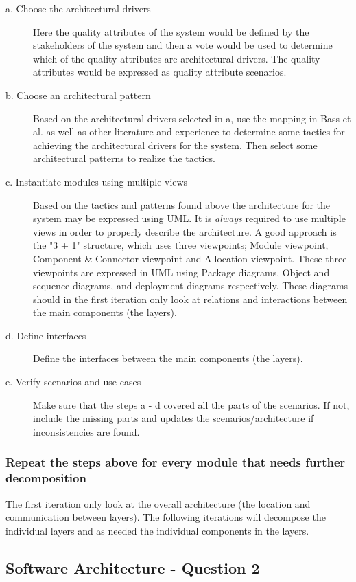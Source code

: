 \begin{description}
    \item[a. Choose the architectural drivers]
  Here the quality attributes of the system would be defined by the stakeholders of the system and then a vote would be used to determine which of the quality attributes are architectural drivers. The quality attributes would be expressed as quality attribute scenarios.
    \item[b. Choose an architectural pattern]
  Based on the architectural drivers selected in a, use the mapping in Bass et al. as well as other literature and experience to determine some tactics for achieving the architectural drivers for the system. Then select some architectural patterns to realize the tactics.
    \item[c. Instantiate modules using multiple views]
  Based on the tactics and patterns found above the architecture for the system may be expressed using UML. It is \emph{always} required to use multiple views in order to properly describe the architecture. A good approach is the "3 + 1" structure, which uses three viewpoints; Module viewpoint, Component \& Connector viewpoint and Allocation viewpoint. These three viewpoints are expressed in UML using Package diagrams, Object and sequence diagrams, and deployment diagrams respectively. These diagrams should in the first iteration only look at relations and interactions between the main components (the layers).
    \item[d. Define interfaces]
  Define the interfaces between the main components (the layers).
    \item[e. Verify scenarios and use cases]
  Make sure that the steps a - d covered all the parts of the scenarios. If not, include the missing parts and updates the scenarios/architecture if inconsistencies are found.
\end{description}
\subsubsection{Repeat the steps above for every module that needs further decomposition}
The first iteration only look at the overall architecture (the location and communication between layers). The following iterations will decompose the individual layers and as needed the individual components in the layers.

\subsection{Software Architecture - Question 2}

